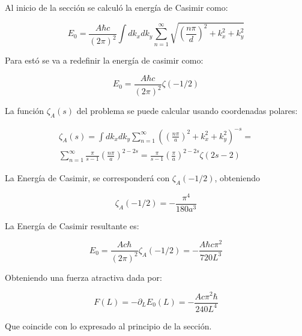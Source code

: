 Al inicio de la sección se calculó la energía de Casimir como:

\begin{equation}
E _0 = \frac{A \hbar c}{(2 \pi) ^2} \int dk _x dk _y 
\sum _{n=1} ^{\infty} 
\sqrt{
		\left( \frac{n \pi}{d} \right) ^2 + k _x ^2 + k _y ^2
		}
\end{equation}

Para estó se va a redefinir la energía de casimir como:

\begin{equation}
E _0 = \frac{A \hbar c}{(2 \pi) ^2} 
\zeta (-1/2)
\end{equation}

La función $\zeta _A (s)$ del problema se puede calcular usando coordenadas polares:

\begin{equation}
\begin{array}{c}

\zeta _A (s) = 
\int dk _x dk _y 
\sum _{n=1} ^{\infty} 
\left(	\left( \frac{n \pi}{a } \right) ^2 + k _x ^2 + k _y ^2
		\right) ^{-s} = \\[10pt]
\sum _{n=1} ^{\infty}  \frac{\pi}{s-1} \left( \frac{n \pi}{a} \right) ^{2-2s} =
\frac{\pi}{s-1} \left( \frac{\pi}{a} \right) ^{2-2s} \zeta (2s-2) 

\end{array}
\end{equation}

La Energía de Casimir, se corresponderá con $\zeta _A (-1/2)$, obteniendo 


\begin{equation}
\zeta _A (-1/2) = 
- \frac{\pi ^4}{180 a ^3}
\end{equation}

La Energía de Casimir resultante es:

\begin{equation}
E _0 =  \frac{A c \hbar}{(2 \pi) ^2}
\zeta _A (-1/2) =
- \frac{A \hbar c \pi ^2}
		{720 L ^3}
\end{equation}

Obteniendo una fuerza atractiva dada por:

\begin{equation}
F(L) = - \partial _L E _0 (L) = 
- \frac{A c \pi ^2 \hbar}{240 L^4}
\end{equation}

Que coincide con lo expresado al principio de la sección. \\ \\



